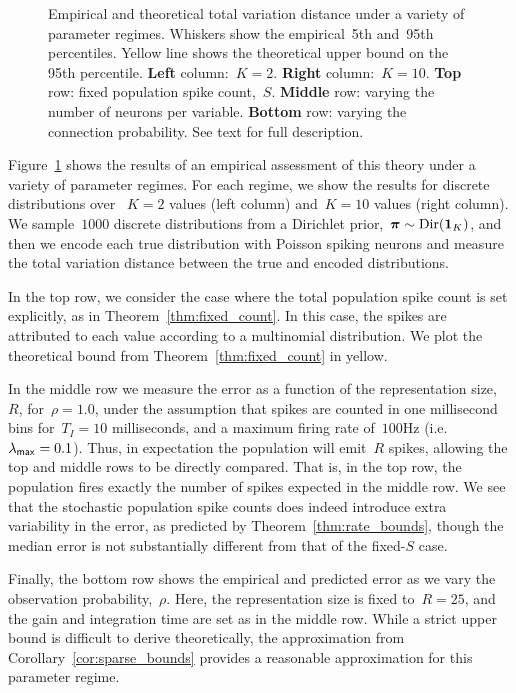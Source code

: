 \begin{figure}[t!]
\begin{subfigure}[b]{2.75in}
 \end{subfigure}
 \vspace{-.3in}
 \caption[Empirical and Theoretical Total Variation Distance]
 {Empirical and theoretical total variation distance under a variety 
   of parameter regimes. Whiskers show the empirical~5th 
   and~95th percentiles. Yellow line shows the theoretical
   upper bound on the 95th percentile. 
   \textbf{Left} column:~$K=2$. \textbf{Right} column:~$K=10$. 
   \textbf{Top} row: fixed population spike count,~$S$. 
   \textbf{Middle} row: varying the number of neurons per variable.
   \textbf{Bottom} row: varying the connection probability.
   See text for full description.
 }
 \label{fig:complexity}
\end{figure}

Figure~\ref{fig:complexity} shows the results of an empirical 
assessment of this theory under a variety of parameter regimes.
For each regime, we show the results for discrete distributions over
~$K=2$ values (left column) and~$K=10$ values (right column). We 
sample~$1000$ discrete distributions from a Dirichlet 
prior,~${\boldsymbol{\pi} \sim \mathrm{Dir}(\boldsymbol{1}_K)}$, and then we encode each true 
distribution with Poisson spiking neurons and measure the total 
variation distance between the true and encoded distributions. 

In the top row, we consider the case where the total population 
spike count is set explicitly, as in Theorem~\ref{thm:fixed_count}.
In this case, the spikes are attributed to each value according 
to a multinomial distribution. We plot the theoretical bound from
Theorem~\ref{thm:fixed_count} in yellow.

In the middle row we measure the error as a function of the
representation size,~$R$, for~$\rho=1.0$, under the assumption that
spikes are counted in one millisecond bins for~$T_I=10$ milliseconds,
and a maximum firing rate of~$100$Hz (i.e.~$\lambda_{\mathsf{max}}=0.1$). Thus, in
expectation the population will emit~$R$ spikes, allowing the top and
middle rows to be directly compared. That is, in the top row, the
population fires exactly the number of spikes expected in the middle
row.  We see that the stochastic population spike counts does indeed
introduce extra variability in the error, as predicted by
Theorem~\ref{thm:rate_bounds}, though the median error is not
substantially different from that of the fixed-$S$ case.

Finally, the bottom row shows the empirical and predicted error as 
we vary the observation probability,~$\rho$. Here, the representation 
size is fixed to~$R=25$, and the gain and integration time are 
set as in the middle row. While a strict upper bound is difficult 
to derive theoretically, the approximation from 
Corollary~\ref{cor:sparse_bounds} provides a reasonable 
approximation for this parameter regime.

